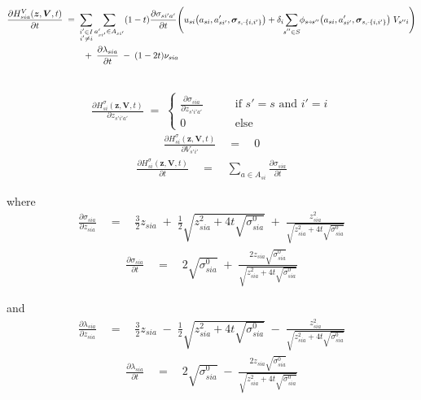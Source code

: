 \documentclass[11pt,fleqn]{article}
\newcommand{\bsigma}{\bm{\sigma}}
\newcommand{\bV}{\bm{V}}
\newcommand{\bz}{\bm{z}}
\newcommand{\shortminus}{{\text{\scalebox{0.4}[1.0]{\(-\)}}}}
\newcommand{\shortrightarrow}{\parbox{4pt}{\tikz{\draw[->](0,0)--(4pt,0);}}}
\begin{document}
\begin{align*}
	\frac{\partial H^V_{sia}(\bz,\bV,t) }{ \partial t } & \;=\; 
	\sum\limits_{\substack{i'\in I \\ i'\neq i}} \sum\limits_{a_{si'}'\in A_{si'}} (1-t) \frac{\partial\sigma_{si'a'}}{\partial t} \Biggl( u_{si}\bigl(a_{si},a_{si'}',\bsigma_{s,\shortminus\{i,i'\}}\bigr) + \delta_i \sum\limits_{\mathclap{s''\in S}} \phi_{s\shortrightarrow s''}\bigl(a_{si},a_{si'}',\bsigma_{s,\shortminus\{i,i'\}}\bigr) \; V_{s''i} \Biggr) \\
	& \qquad \;+\; \frac{\partial\lambda_{sia}}{\partial t} \;-\; (1-2t) \nu_{sia} \\
	& 
\end{align*}

\begin{align*}
	\frac{ \partial H^\sigma_{si}(\bz,\bV,t) }{ \partial z_{s'i'a'}} \;=\; 
	\begin{cases}
		\frac{\partial\sigma_{sia}}{\partial z_{s'i'a'} } \qquad&\text{if } s'=s \text{ and } i'=i \\
		0 \qquad&\text{else}  
	\end{cases}
\end{align*}
\begin{align*}
	\frac{ \partial H^\sigma_{si}(\bz,\bV,t) }{ \partial V_{s'i'} } \quad=\quad 0
\end{align*}
\begin{align*}
	\frac{ \partial H^\sigma_{si}(\bz,\bV,t) }{ \partial t } \quad=\quad \sum\limits_{a\in A_{si}} \frac{\partial\sigma_{sia}}{\partial t}
\end{align*}

where
\begin{align*}
	\frac{\partial\sigma_{sia}}{\partial z_{sia}} \quad=\quad \frac{3}{2} z_{sia} \;+\; \frac{1}{2} \sqrt{z_{sia}^2+4t\sqrt{\sigma^0_{sia}}} \;+\; \frac{z_{sia}^2}{\sqrt{z_{sia}^2+4t\sqrt{\sigma^0_{sia}}}}
\end{align*}
\begin{align*}
	\frac{\partial\sigma_{sia}}{\partial t} \quad=\quad 2\sqrt{\sigma^0_{sia}} \;+\; \frac{2z_{sia}\sqrt{\sigma^0_{sia}}}{\sqrt{z_{sia}^2+4t\sqrt{\sigma^0_{sia}}}}
\end{align*}

and
\begin{align*}
	\frac{\partial\lambda_{sia}}{\partial z_{sia}} \quad=\quad \frac{3}{2} z_{sia} \;-\; \frac{1}{2} \sqrt{z_{sia}^2+4t\sqrt{\sigma^0_{sia}}} \;-\; \frac{z_{sia}^2}{\sqrt{z_{sia}^2+4t\sqrt{\sigma^0_{sia}}}}
\end{align*}
\begin{align*}
	\frac{\partial\lambda_{sia}}{\partial t} \quad=\quad 2\sqrt{\sigma^0_{sia}} \;-\; \frac{2z_{sia}\sqrt{\sigma^0_{sia}}}{\sqrt{z_{sia}^2+4t\sqrt{\sigma^0_{sia}}}}
\end{align*}






\newpage

\end{document}
